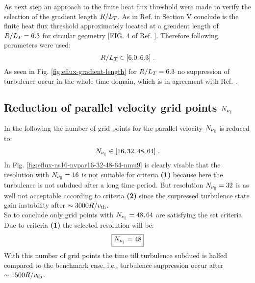As next step an approach to the finite heat flux threshold were made to verify the selection of the gradient length $R/L_T$. As in Ref.  in Section V conclude is the finite heat flux threshold approximately located at a grendent length of $R/L_T = 6.3$ for circular geometry [FIG. 4 of Ref. ]. Therefore following parameters were used:
\begin{gather*}
	R/L_T \in [6.0, 6.3]~.
\end{gather*}
As seen in Fig. \ref{fig:eflux-gradient-length} for $R/L_T = 6.3$ no suppression of turbulence occur in the whole time domain, which is in agreement with Ref. .


\subsection{Reduction of parallel velocity grid points $N_{\nu_\parallel}$}
\label{sub:reduceNvpar}

In the following the number of grid points for the parallel velocity $N_{\nu_\parallel}$ is reduced to:
\begin{gather*}
	N_{\nu_\parallel} \in [16, 32, 48, 64]~.
\end{gather*}
In Fig. \ref{fig:eflux-ns16-nvpar16-32-48-64-nmu9} is clearly visable that the resolution with $N_{\nu_\parallel} = 16$ is not suitable for criteria \textbf{(1)} because here the turbulence is not subdued after a long time period. But resolution $N_{\nu_\parallel} = 32$ is as well not acceptable according to criteria \textbf{(2)} since the surpressed turbulence state gain instability after $\sim 3000 R/v_{\mathrm{th}}$.\\
So to conclude only grid points with $N_{\nu_\parallel} = 48, 64$ are satisfying the set criteria. Due to criteria \textbf{(1)} the selected resolution will be:
\begin{gather*}
	\boxed{N_{\nu_\parallel} = 48}
\end{gather*}
With this number of grid points the time till turbulence subdued is halfed compared to the benchmark case, i.e., turbulence suppression occur after $\sim 1500 R/v_{\mathrm{th}}$.


